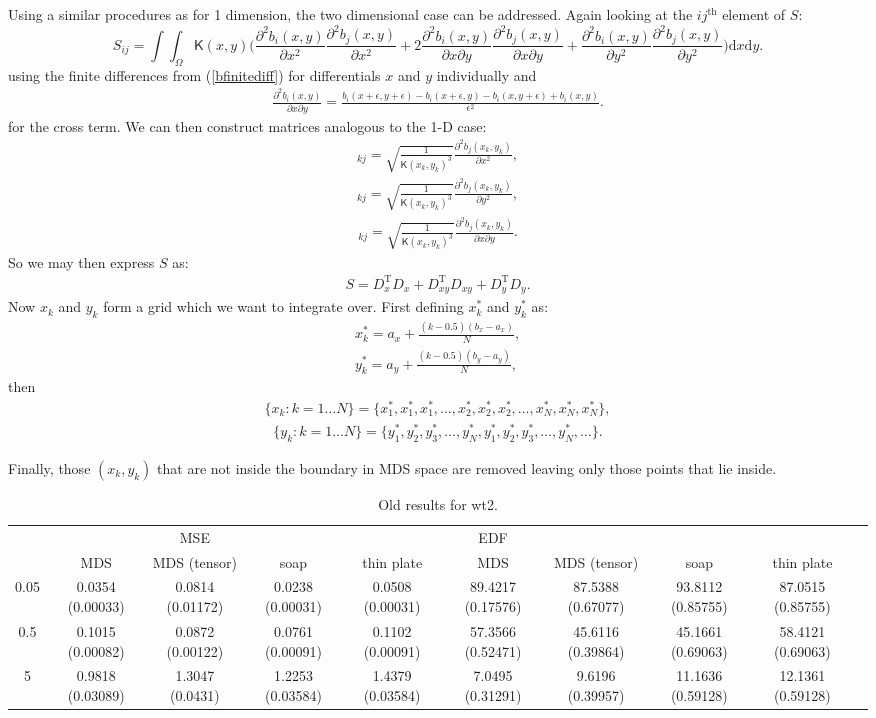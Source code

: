 \documentclass[a4paper,10pt]{article}
\newcommand{\eqn}[1]{(\ref{#1})}
\newcommand{\tr}[1]{#1^{\text{T}}}
\newcommand{\be}{\begin{eqnarray}}
\newcommand{\ee}{\end{eqnarray}}
\begin{document}
Using a similar procedures as for 1 dimension, the two dimensional case can be addressed. Again looking at the $ij^\text{th}$ element of $S$:
\begin{equation}
S_{ij}=\int\int_\Omega \mathsf{K}(x,y) \Big( \frac{\partial^2 b_i(x,y)}{\partial x^2}\frac{\partial^2 b_j(x,y)}{\partial x^2}+2\frac{\partial^2 b_i(x,y)}{\partial x \partial y}\frac{\partial^2 b_j(x,y)}{\partial x \partial y}+\frac{\partial^2 b_i(x,y)}{\partial y^2}\frac{\partial^2 b_j(x,y)}{\partial y^2} \Big) \text{d}x\text{d}y.
\label{kdeadjust}
\end{equation}
using the finite differences from \eqn{bfinitediff} for differentials $x$ and $y$ individually and
\be
\frac{\partial^2 b_i(x,y)}{\partial x \partial y} = \frac{ b_i(x+\epsilon,y+\epsilon) - b_i(x+\epsilon,y) - b_i(x,y+\epsilon) + b_i(x,y)}{\epsilon^2}.
\ee
for the cross term. We can then construct matrices analogous to the 1-D case:
\be
[D_x]_{kj}=\sqrt{\frac{1}{\mathsf{K}(x_k,y_k)^3}} \frac{\partial^2 b_j(x_k,y_k)}{\partial x^2},
\ee
\be
[D_y]_{kj}=\sqrt{\frac{1}{\mathsf{K}(x_k,y_k)^3}} \frac{\partial^2 b_j(x_k,y_k)}{\partial y^2},
\ee
\be
[D_{xy}]_{kj}=\sqrt{\frac{1}{\mathsf{K}(x_k,y_k)^3}} \frac{\partial^2 b_j(x_k,y_k)}{\partial x \partial y}.
\ee
So we may then express $S$ as:
\be
S=\tr{D_x}D_x + \tr{D_{xy}}D_{xy} + \tr{D_y}D_y.
\ee
Now $x_k$ and $y_k$ form a grid which we want to integrate over. First defining $x^*_k$ and $y^*_k$ as:
\be
x^*_k=a_x+\frac{(k-0.5)(b_x-a_x)}{N},\\
y^*_k=a_y+\frac{(k-0.5)(b_y-a_y)}{N},
\ee
then
\be
\{x_k : k=1\dots N\} = \{x^*_1,x^*_1,x^*_1,\dots, x^*_2, x^*_2, x^*_2,\dots, x^*_N, x^*_N, x^*_N\},
\ee
\be
\{y_k : k=1\dots N\} = \{y^*_1,y^*_2, y^*_3,\dots, y^*_N,y^*_1,y^*_2, y^*_3,\dots, y^*_N,\dots\}.
\ee

Finally, those $(x_k,y_k)$ that are not inside the boundary in MDS space are removed leaving only those points that lie inside.






\begin{table}[ht]
\centering
\begin{tabular}{c c c c c c c c c c}
 & & MSE & &  & EDF & \\ 
 & MDS & MDS (tensor) & soap & thin plate & MDS & MDS (tensor) & soap & thin plate\\ 
0.05  & 0.0354 (0.00033) & 0.0814 (0.01172) & 0.0238 (0.00031) &0.0508 (0.00031) &89.4217 (0.17576) & 87.5388 (0.67077) & 93.8112 (0.85755) & 87.0515 (0.85755)\\ 
0.5  & 0.1015 (0.00082) & 0.0872 (0.00122) & 0.0761 (0.00091) &0.1102 (0.00091) &57.3566 (0.52471) & 45.6116 (0.39864) & 45.1661 (0.69063) & 58.4121 (0.69063)\\ 
5  & 0.9818 (0.03089) & 1.3047 (0.0431) & 1.2253 (0.03584) &1.4379 (0.03584) &7.0495 (0.31291) & 9.6196 (0.39957) & 11.1636 (0.59128) & 12.1361 (0.59128)\\ 
\end{tabular}
\caption{Old results for wt2.}
\end{table}
\end{document}
